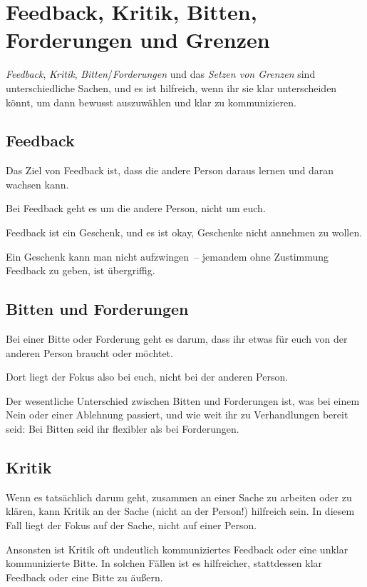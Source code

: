 \section{Feedback, Kritik, Bitten, Forderungen und Grenzen}
\label{feedback-vs-kritik}

\emph{Feedback}, \emph{Kritik}, \emph{Bitten}/\emph{Forderungen} und das \emph{Setzen von Grenzen} sind unterschiedliche Sachen, und es ist hilfreich, wenn ihr sie klar unterscheiden könnt, um dann bewusst auszuwählen und klar zu kommunizieren.

\subsection{Feedback}

Das Ziel von Feedback ist, dass die andere Person daraus lernen und daran wachsen kann.

Bei Feedback geht es um die andere Person, nicht um euch.

Feedback ist ein Geschenk, und es ist okay, Geschenke nicht annehmen zu wollen.

Ein Geschenk kann man nicht aufzwingen~-- jemandem ohne Zustimmung Feedback zu geben, ist übergriffig.

\subsection{Bitten und Forderungen}

Bei einer Bitte oder Forderung geht es darum, dass ihr etwas für euch von der anderen Person braucht oder möchtet.

Dort liegt der Fokus also bei euch, nicht bei der anderen Person.

Der wesentliche Unterschied zwischen Bitten und Forderungen ist, was bei einem Nein oder einer Ablehnung passiert, und wie weit ihr zu Verhandlungen bereit seid: Bei Bitten seid ihr flexibler als bei Forderungen.

\subsection{Kritik}

Wenn es tatsächlich darum geht, zusammen an einer Sache zu arbeiten oder zu klären, kann Kritik an der Sache (nicht an der Person!) hilfreich sein. In diesem Fall liegt der Fokus auf der Sache, nicht auf einer Person.

Ansonsten ist Kritik oft undeutlich kommuniziertes Feedback oder eine unklar kommunizierte Bitte. In solchen Fällen ist es hilfreicher, stattdessen klar Feedback oder eine Bitte zu äußern.

